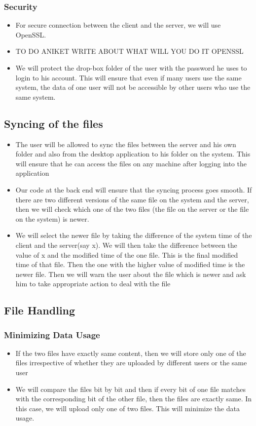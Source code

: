\documentclass{article}
\begin{document}
			\subsubsection{Security}
				\begin{itemize}
					\item For secure connection between the client and the server, we will use OpenSSL.
					\item TO DO ANIKET WRITE ABOUT WHAT WILL YOU DO IT OPENSSL
					\item We will protect the drop-box folder of the user with the password he uses to login to his account. This will ensure that even if many users use the same system, the data of one user will not be accessible by other users who use the same system.
				\end{itemize}
			\subsection{Syncing of the files}
			\begin{itemize}
				\item The user will be allowed to sync the files between the server and his own folder and also from the desktop application to his folder on the system. This will ensure that he can access the files on any machine after logging into the application
				\item Our code at the back end will ensure that the syncing process goes smooth. If there are two different versions of the same file on the system and the server, then we will check which one of the two files (the file on the server or the file on the system) is newer.
				\item We will select the newer file by taking the difference of the system time of the client and the server(say x). We will then take the difference between the value of x and the modified time of the one file. This is the final modified time of that file. Then the one with the higher value of modified time is the newer file. Then we will warn the user about the file which is newer and ask him to take appropriate action to deal with the file
			\end{itemize}
		\subsection{File Handling}
			\subsubsection{Minimizing Data Usage}
				\begin{itemize}
					\item If the two files have exactly same content, then we will store only one of the files irrespective of whether they are uploaded by different users or the same user
					\item We will compare the files bit by bit and then if every bit of one file matches with the corresponding bit of the other file, then the files are exactly same. In this case, we will upload only one of two files. This will minimize the data usage.
				\end{itemize}
\end{document}
